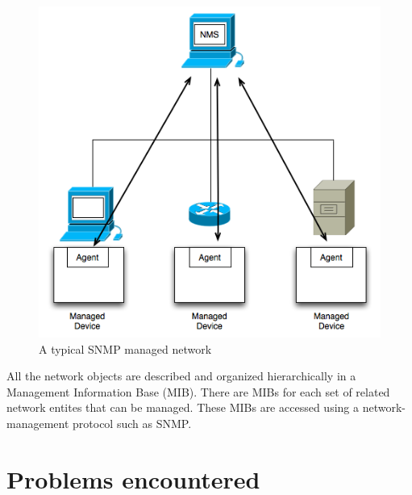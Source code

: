 \begin{figure}[H]
\centering
	\includegraphics[width=.7\linewidth]{Pictures/Chapter3/snmp.png}
	\caption{A typical SNMP managed network}
\end{figure}

All the network objects are described and organized hierarchically in a Management Information Base (MIB). There are MIBs for each set of related network entites that can be managed. These MIBs are accessed using a network-management protocol such as SNMP.


\section{Problems encountered}